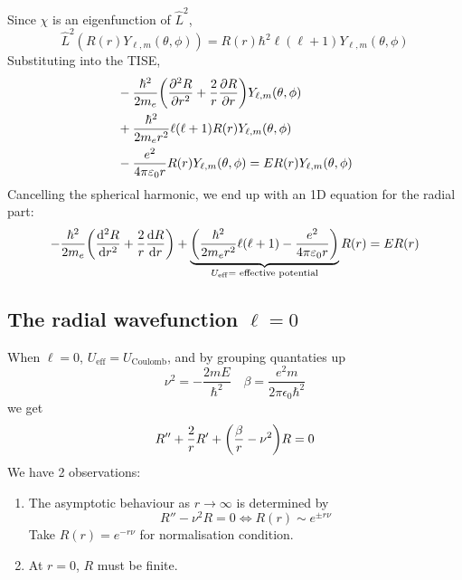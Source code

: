 \documentclass[a4paper,11pt]{article}
\begin{document}
Since \( \chi \) is an eigenfunction of \( \hat L^2 \),
\[
	\hat L^2 (R(r) Y_{\ell,m}(\theta,\phi)) = R(r) \hbar^2 \ell (\ell+1)Y_{\ell,m}(\theta, \phi)
\]
Substituting into the TISE,
\begin{align*}
	&-\frac{\hbar^2}{2m_e} \qty( \pdv[2]{R}{r} 
	+ \frac{2}{r} \pdv{R}{r} ) Y_{\ell,m}(\theta, \phi) \\ 
	&+ \frac{\hbar^2}{2 m_e r^2} \ell(\ell+1) R(r)Y_{\ell,m}(\theta, \phi) \\ 
	&-\frac{e^2}{4 \pi \varepsilon_0 r} R(r)Y_{\ell,m}(\theta,\phi) = E R(r)Y_{\ell,m}(\theta,\phi)
\end{align*}
Cancelling the spherical harmonic, we end up with an 1D equation for the radial part:
\[
	-\frac{\hbar^2}{2m_e} \qty( \dv[2]{R}{r} + \frac{2}{r} \dv{R}{r} ) + \underbrace{\qty(\frac{\hbar^2}{2 m_e r^2} \ell(\ell+1) - \frac{e^2}{4 \pi \varepsilon_0 r})}_{U_{\mathrm{eff}} = \text{ effective potential}} R(r) = E R(r)
\]
\subsection{The radial wavefunction $ \ell=0 $}

When $ \ell=0 $, $ U_{\text{eff}} = U_{\text{Coulomb}} $, and by grouping quantaties up
\[
	\nu^2 = - \frac{2m E}{\hbar^2} \quad \beta = \frac{e^2m}{2\pi\epsilon_0 \hbar^2}
\]
we get
\[
	R'' + \frac{2}{r} R' + \qty(\frac{\beta}{r} - \nu^2 )R = 0
\]
We have 2 observations:
\begin{enumerate}
	\item The asymptotic behaviour as $ r\to \infty $ is determined by 
	\[
		R'' - \nu^2 R = 0 \iff R(r) \sim e^{\pm r \nu}
	\]
	Take $ R(r) = e^{-r\nu} $ for normalisation condition. 
	\item At $r=0$, $R$ must be finite. 
\end{enumerate}
\end{document}
